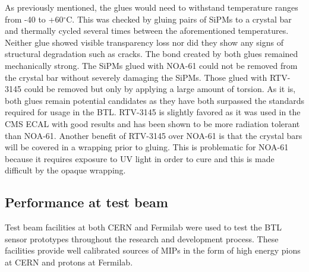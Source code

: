 As previously mentioned, the glues would need to withstand temperature ranges from -40 to +60$^\circ$C.  This was checked by gluing pairs of SiPMs to a crystal bar and thermally cycled several times between the aforementioned temperatures.  Neither glue showed visible transparency loss nor did they show any signs of structural degradation such as cracks.  The bond created by both glues remained mechanically strong.  The SiPMs glued with NOA-61 could not be removed from the crystal bar without severely damaging the SiPMs.  Those glued with RTV-3145 could be removed but only by applying a large amount of torsion.  As it is, both glues remain potential candidates as they have both surpassed the standards required for usage in the BTL.  RTV-3145 is slightly favored as it was used in the CMS ECAL with good results and has been shown to be more radiation tolerant than NOA-61.  Another benefit of RTV-3145 over NOA-61 is that the crystal bars will be covered in a wrapping prior to gluing.  This is problematic for NOA-61 because it requires exposure to UV light in order to cure and this is made difficult by the opaque wrapping.  

\subsection{Performance at test beam}

Test beam facilities at both CERN and Fermilab were used to test the BTL sensor prototypes throughout the research and development process.  These facilities provide well calibrated sources of MIPs in the form of high energy pions at CERN and protons at Fermilab.  




